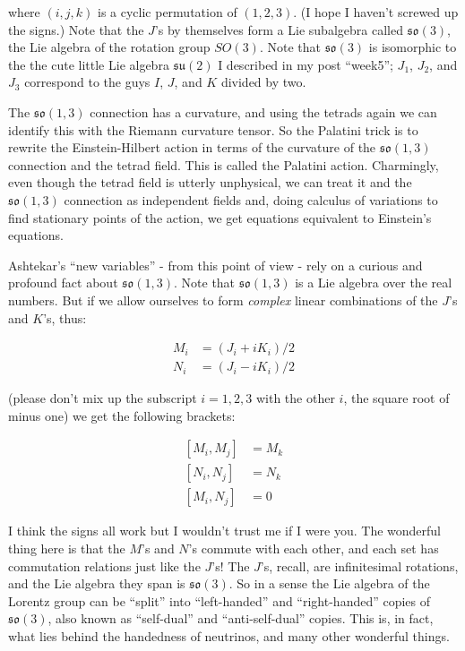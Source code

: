 \documentclass{article}
\begin{document}
where \((i,j,k)\) is a cyclic permutation of \((1,2,3)\). (I hope I
haven't screwed up the signs.) Note that the \(J\)'s by themselves form
a Lie subalgebra called \(\mathfrak{so}(3)\), the Lie algebra of the
rotation group \(SO(3)\). Note that \(\mathfrak{so}(3)\) is isomorphic
to the the cute little Lie algebra \(\mathfrak{su}(2)\) I described in
my post ``week5''; \(J_1\), \(J_2\), and \(J_3\) correspond to the guys
\(I\), \(J\), and \(K\) divided by two.

The \(\mathfrak{so}(1,3)\) connection has a curvature, and using the
tetrads again we can identify this with the Riemann curvature tensor. So
the Palatini trick is to rewrite the Einstein-Hilbert action in terms of
the curvature of the \(\mathfrak{so}(1,3)\) connection and the tetrad
field. This is called the Palatini action. Charmingly, even though the
tetrad field is utterly unphysical, we can treat it and the
\(\mathfrak{so}(1,3)\) connection as independent fields and, doing
calculus of variations to find stationary points of the action, we get
equations equivalent to Einstein's equations.

Ashtekar's ``new variables'' - from this point of view - rely on a
curious and profound fact about \(\mathfrak{so}(1,3)\). Note that
\(\mathfrak{so}(1,3)\) is a Lie algebra over the real numbers. But if we
allow ourselves to form \emph{complex} linear combinations of the
\(J\)'s and \(K\)'s, thus:

\[\begin{aligned}M_i &= (J_i + iK_i)/2 \\ N_i &= (J_i - iK_i)/2\end{aligned}\]

(please don't mix up the subscript \(i = 1,2,3\) with the other \(i\),
the square root of minus one) we get the following brackets:

\[\begin{aligned}[M_i,M_j] &= M_k \\ [N_i,N_j] &= N_k \\ [M_i,N_j] &= 0\end{aligned}\]

I think the signs all work but I wouldn't trust me if I were you. The
wonderful thing here is that the \(M\)'s and \(N\)'s commute with each
other, and each set has commutation relations just like the \(J\)'s! The
\(J\)'s, recall, are infinitesimal rotations, and the Lie algebra they
span is \(\mathfrak{so}(3)\). So in a sense the Lie algebra of the
Lorentz group can be ``split'' into ``left-handed'' and ``right-handed''
copies of \(\mathfrak{so}(3)\), also known as ``self-dual'' and
``anti-self-dual'' copies. This is, in fact, what lies behind the
handedness of neutrinos, and many other wonderful things.
\end{document}
